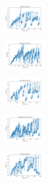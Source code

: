\begin{figure}[H]    
    \centering
    \begin{subfigure}
        \centering
        \includegraphics[width=0.234\textwidth]{img/ils/iris_set_const_10_949004259_time.png}
    \end{subfigure}
    \hfill
    \begin{subfigure}
        \centering
        \includegraphics[width=0.234\textwidth]{img/ils/ecoli_set_const_10_949004259_time.png}
    \end{subfigure}
    \hfill
    \begin{subfigure}
        \centering
        \includegraphics[width=0.234\textwidth]{img/ils/rand_set_const_10_949004259_time.png}
    \end{subfigure}
    \hfill
    \begin{subfigure}
        \centering
        \includegraphics[width=0.234\textwidth]{img/ils/newthyroid_set_const_10_949004259_time.png}
    \end{subfigure}
    \hfill
    \begin{subfigure}
        \centering
        \includegraphics[width=0.234\textwidth]{img/ils/iris_set_const_10_589741062_time.png}
    \end{subfigure}
    \hfill
    \begin{subfigure}

\end{subfigure}
\end{figure}
